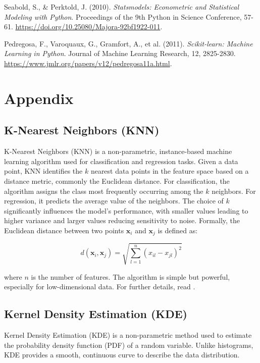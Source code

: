 \documentclass[a4paper, 12pt]{article}
\begin{document}
\begin{thebibliography}{15}
Seabold, S., \& Perktold, J. (2010).
\textit{Statsmodels: Econometric and Statistical Modeling with Python}.
Proceedings of the 9th Python in Science Conference, 57-61.
\href{https://doi.org/10.25080/Majora-92bf1922-011}{https://doi.org/10.25080/Majora-92bf1922-011}.

Pedregosa, F., Varoquaux, G., Gramfort, A., et al. (2011).
\textit{Scikit-learn: Machine Learning in Python}.
Journal of Machine Learning Research, 12, 2825-2830.
\href{https://www.jmlr.org/papers/v12/pedregosa11a.html}{https://www.jmlr.org/papers/v12/pedregosa11a.html}.


    \end{thebibliography}

    \endgroup


\appendix
\section{Appendix}

\subsection{K-Nearest Neighbors (KNN)} \label{appendix:knn}
K-Nearest Neighbors (KNN) is a non-parametric, instance-based machine learning algorithm used for classification and regression tasks. Given a data point, KNN identifies the \(k\) nearest data points in the feature space based on a distance metric, commonly the Euclidean distance. For classification, the algorithm assigns the class most frequently occurring among the \(k\) neighbors. For regression, it predicts the average value of the neighbors. The choice of \(k\) significantly influences the model's performance, with smaller values leading to higher variance and larger values reducing sensitivity to noise. Formally, the Euclidean distance between two points \(\mathbf{x}_i\) and \(\mathbf{x}_j\) is defined as:

\[
d(\mathbf{x}_i, \mathbf{x}_j) = \sqrt{\sum_{l=1}^{n} (x_{il} - x_{jl})^2}
\]

where \(n\) is the number of features. The algorithm is simple but powerful, especially for low-dimensional data. For further details, read \cite{knn_model_based}.

\subsection{Kernel Density Estimation (KDE)} \label{appendix:kde}
Kernel Density Estimation (KDE) is a non-parametric method used to estimate the probability density function (PDF) of a random variable. Unlike histograms, KDE provides a smooth, continuous curve to describe the data distribution.
\end{document}
